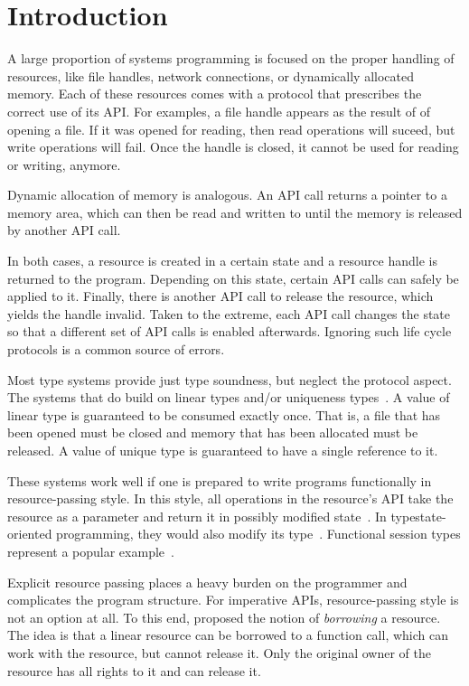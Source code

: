\section{Introduction}

A large proportion of systems programming is focused on the proper
handling of resources, like file handles, network connections, or
dynamically allocated memory. Each of these resources comes with a
protocol that prescribes the correct use of its API.
For examples, a file handle appears as the result of of opening a
file. If it was opened for reading, then read operations will suceed,
but write operations will fail. Once the handle is closed, it cannot
be used for reading or writing, anymore.

Dynamic allocation of memory is analogous. An API call returns a
pointer to a memory area, which can then be read and written to until
the memory is released by another API call.

In both cases, a resource is created in a certain state and a resource
handle is returned to the program. Depending on this state, certain API calls
can safely be applied to it. Finally, there is another API call to
release the resource, which yields the handle invalid.
Taken to the extreme, each API call changes the state so that a
different set of API calls is enabled afterwards. 
Ignoring such life cycle protocols is a common source of errors.


Most type systems provide just type soundness, but neglect the
protocol aspect. The systems that do build on linear types \cite{DBLP:journals/tcs/Girard87} and/or
uniqueness types~\cite{DBLP:conf/plilp/BarendsenS95}. A value of linear
type is guaranteed to be consumed 
exactly once. That is, a file that has been opened must be closed and
memory that has been allocated must be released. A value of unique
type is guaranteed to have a single reference to it.

These systems work well if one is prepared to write programs
functionally in resource-passing style. In this style, all operations
in the resource's API take the resource as a parameter and return it
in possibly modified state~\cite{DBLP:journals/jfp/AchtenP95}. In
typestate-oriented programming, they would also modify its
type~\cite{DBLP:conf/oopsla/AldrichSSS09}. Functional session types 
represent a popular example~\cite{DBLP:journals/jfp/GayV10}. 

Explicit resource passing places a heavy burden on the programmer and
complicates the program structure. For imperative APIs,
resource-passing style is not an option at all. To this end,
\citet{DBLP:conf/popl/BoylandR05}  proposed the notion of
\emph{borrowing} a resource. The idea is that a linear resource can be
borrowed to a function call, which can work with the resource, but
cannot release it. Only the original owner of the resource has all
rights to it and can release it.


